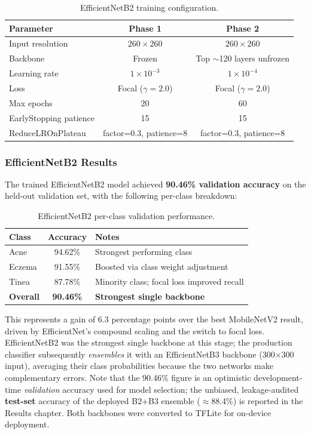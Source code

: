 \begin{table}[H]
\centering
\caption{EfficientNetB2 training configuration.}
\label{tab:b2_config}
\begin{tabular}{|l|c|c|}
\hline
\textbf{Parameter} & \textbf{Phase 1} & \textbf{Phase 2} \\ \hline
Input resolution & $260 \times 260$ & $260 \times 260$ \\ \hline
Backbone & Frozen & Top $\sim$120 layers unfrozen \\ \hline
Learning rate & $1 \times 10^{-3}$ & $1 \times 10^{-4}$ \\ \hline
Loss & Focal ($\gamma = 2.0$) & Focal ($\gamma = 2.0$) \\ \hline
Max epochs & 20 & 60 \\ \hline
EarlyStopping patience & 15 & 15 \\ \hline
ReduceLROnPlateau & factor=0.3, patience=8 & factor=0.3, patience=8 \\ \hline
\end{tabular}
\end{table}

\subsubsection{EfficientNetB2 Results}

The trained EfficientNetB2 model achieved \textbf{90.46\% validation accuracy} on the held-out validation set, with the following per-class breakdown:

\begin{table}[H]
\centering
\caption{EfficientNetB2 per-class validation performance.}
\label{tab:b2_results}
\begin{tabular}{|l|c|l|}
\hline
\textbf{Class} & \textbf{Accuracy} & \textbf{Notes} \\ \hline
Acne & 94.62\% & Strongest performing class \\ \hline
Eczema & 91.55\% & Boosted via class weight adjustment \\ \hline
Tinea & 87.78\% & Minority class; focal loss improved recall \\ \hline
\textbf{Overall} & \textbf{90.46\%} & \textbf{Strongest single backbone} \\ \hline
\end{tabular}
\end{table}

This represents a gain of 6.3 percentage points over the best MobileNetV2 result, driven by EfficientNet's compound scaling and the switch to focal loss. EfficientNetB2 was the strongest single backbone at this stage; the production classifier subsequently \emph{ensembles} it with an EfficientNetB3 backbone (300$\times$300 input), averaging their class probabilities because the two networks make complementary errors. Note that the 90.46\% figure is an optimistic development-time \emph{validation} accuracy used for model selection; the unbiased, leakage-audited \textbf{test-set} accuracy of the deployed B2+B3 ensemble ($\approx$88.4\%) is reported in the Results chapter. Both backbones were converted to TFLite for on-device deployment.


